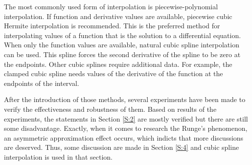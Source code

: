 \documentclass[preprint,12pt]{elsarticle}
\begin{document}
The most commonly used form of interpolation is piecewise-polynomial interpolation. If function and derivative values are available, piecewise cubic Hermite interpolation is recommended. This is the preferred method for interpolating values of a function that is the solution to a differential equation. When only the function values are available, natural cubic spline interpolation can be used. This spline forces the second derivative of the spline to be zero at the endpoints. Other cubic splines require additional data. For example, the clamped cubic spline needs values of the derivative of the function at the endpoints of the interval.

After the introduction of those methods, several experiments have been made to verify the effectiveness and robustness of them. Based on results of the experiments, the statements in Section \ref{S:2} are mostly verified but there are still some disadvantage. Exactly, when it comes to research the Runge's phenomenon, an asymmetric approximation effect occurs, which indicts that more discussions are deserved. Thus, some discussion are made in Section \ref{S:4} and cubic spline interpolation is used in that section.













\end{document}
